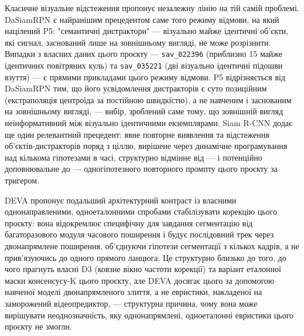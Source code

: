 \documentclass[11pt]{article}
\begin{document}
Класичне візуальне відстеження пропонує незалежну лінію на тій самій проблемі. DaSiamRPN \citep{zhu2018} є найранішим прецедентом саме того режиму відмови, на який націлений P5: "семантичні дистрактори" --- візуально майже ідентичні об'єкти, які сигнал, заснований лише на зовнішньому вигляді, не може розрізнити. Випадки з власних даних цього проєкту --- \texttt{sav\_022396} (приблизно 15 майже ідентичних повітряних куль) та \texttt{sav\_035221} (дві візуально ідентичні підошви взуття) --- є прямими прикладами цього режиму відмови. P5 відрізняється від DaSiamRPN тим, що його усвідомлення дистракторів є суто позиційним (екстраполяція центроїда за постійною швидкістю), а не навченим і заснованим на зовнішньому вигляді, --- вибір, зроблений саме тому, що зовнішній вигляд неінформативний між візуально ідентичними екземплярами. Siam R-CNN \citep{voigtlaender2020} додає ще один релевантний прецедент: явне повторне виявлення та відстеження об'єктів-дистракторів поряд з ціллю, вирішене через динамічне програмування над кількома гіпотезами в часі, структурно відмінне від --- і потенційно доповнювальне до --- одногіпотезного повторного промпту цього проєкту за тригером.

DEVA \citep{cheng2023deva} пропонує подальший архітектурний контраст із власними однонаправленими, одноеталонними спробами стабілізувати корекцію цього проєкту: вона відокремлює специфічну для завдання сегментацію від багаторазового модуля часового поширення і будує послідовний трек через двонапрямлене поширення, об'єднуючи гіпотези сегментації з кількох кадрів, а не прив'язуючись до одного прямого ланцюга. Це структурно близько до того, до чого прагнуть власні D3 (ковзне вікно частоти корекції) та варіант еталонної маски консенсусу-K цього проєкту, але DEVA досягає цього за допомогою навченої моделі двонапрямленого злиття, а не евристики, накладеної на заморожений відеопредиктор, --- структурна причина, чому вона може вирішувати неоднозначність, яку однонапрямлені, одноеталонні евристики цього проєкту не змогли.
\end{document}
